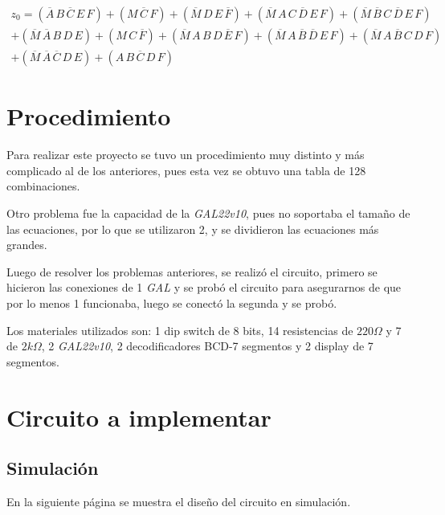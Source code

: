 \documentclass[12pt, oneside, openany]{article}
\begin{document}
{    \begin{multline*}
        z_0 = (\overline{A}\,B\,\overline{C}\,E\,F) + (M\,\overline{C}\,F) + (\overline{M}\,D\,E\,\overline{F}) + (\overline{M}\,A\,C\,\overline{D}\,E\,F) + (\overline{M}\,\overline{B}\,C\,\overline{D}\,E\,F) \\
        + (\overline{M}\,\overline{A}\,B\,D\,E) + (M\,C\,\overline{F}) + (\overline{M}\,A\,B\,D\,\overline{E}\,F) + (\overline{M}\,A\,\overline{B}\,\overline{D}\,E\,F) + (\overline{M}\,A\,\overline{B}\,C\,D\,F) \\
        + (\overline{M}\,\overline{A}\,\overline{C}\,D\,E) + (A\,B\,\overline{C}\,D\,F)
    \end{multline*}
}

\newpage
\section{Procedimiento}
{\sffamily\large
    \hspace{0.5cm} Para realizar este proyecto se tuvo un procedimiento muy distinto y más complicado al de los anteriores, pues esta vez se obtuvo una tabla de 128 combinaciones.
    
    \hspace{0.5cm} Otro problema fue la capacidad de la \emph{GAL22v10}, pues no soportaba el tamaño de las ecuaciones, por lo que se utilizaron 2, y se dividieron las ecuaciones más grandes.
    
    \hspace{0.5cm} Luego de resolver los problemas anteriores, se realizó el circuito, primero se hicieron las conexiones de 1 \emph{GAL} y se probó el circuito para asegurarnos de que por lo menos 1 funcionaba, luego se conectó la segunda y se probó.
    
    \hspace{0.5cm} Los materiales utilizados son: 1 dip switch de 8 bits, 14 resistencias de $220\Omega$ y 7 de $2k\Omega$,
    2 \emph{GAL22v10}, 2 decodificadores BCD-7 segmentos y 2 display de 7 segmentos.
}

\section{Circuito a implementar}
\subsection{Simulación}
{\sffamily\large
    \hspace{0.5cm} En la siguiente página se muestra el diseño del circuito en simulación.
    
    \newpage
    
}
\end{document}
